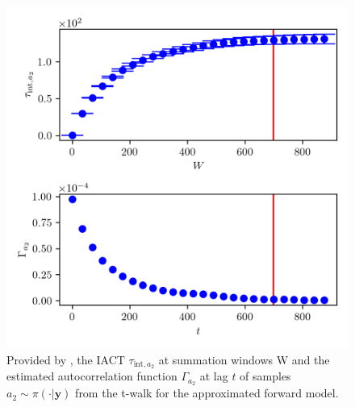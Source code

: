 \begin{figure}[ht!]
	\centering
	\includegraphics{UwerrTauIntTWalk10.png}
	\caption[IACT and autocorrelation function of samples $a_2 \sim \pi(\cdot|\bm{y})$, for approximated model.]{Provided by \cite{drikHesse}, the IACT $\tau_{\text{int},a_2}$ at summation windows W and the estimated autocorrelation function $\Gamma_{a_2}$ at lag $t$ of samples $a_2 \sim \pi( \cdot | \bm{y})$ from the t-walk for the approximated forward model.}
	\label{fig:TWalkIATC11}
\end{figure}


